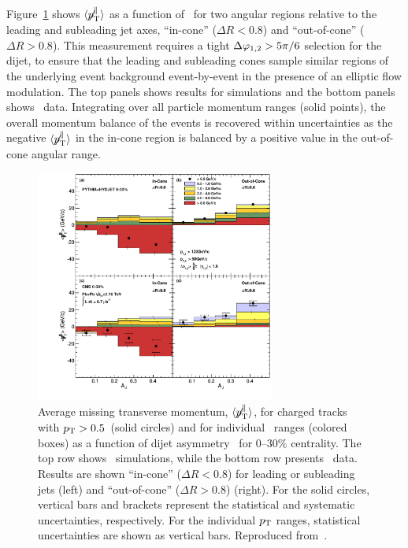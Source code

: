 Figure~\ref{fig:GR:CMS_missingpT} shows $\langle \displaystyle{\not} p_{\mathrm{T}}^{\parallel} \rangle$
as a function of \AJ\ for two angular regions relative to the leading and subleading
jet axes, ``in-cone'' ($\Delta R < 0.8$) and ``out-of-cone'' ($\Delta R > 0.8$).
This measurement requires a tight $\Delta\varphi_{1,2} > 5 \pi/6$ selection for the dijet, to ensure that the 
leading and subleading cones sample similar regions of the underlying event background 
event-by-event in the presence of an elliptic flow modulation.
The top panels shows results for  {} simulations and the bottom panels shows
\PbPb\ data. Integrating over all particle momentum ranges (solid points),
 the overall momentum balance of the events is recovered within uncertainties
as the negative $\langle \displaystyle{\not} p_{\mathrm{T}}^{\parallel} \rangle$ in
the in-cone region is balanced by a positive value in the out-of-cone angular range.

\begin{figure}[!ht]
\begin{center}
\includegraphics[width=0.7\textwidth]{jetfigures/missingPtParallel-Corrected-data-InConeOutConeDPhiCut_ntv6_2.pdf}
\caption{Average missing transverse momentum,
$\langle \displaystyle{\not} p_{\mathrm{T}}^{\parallel} \rangle$,
for charged tracks with $\mbox{$p_{\mathrm{T}}$} > 0.5$\GeVc\ (solid circles) and for individual \pT\ ranges (colored boxes)
as a function of dijet asymmetry \AJ\ for 0--30\% centrality.
The top row shows \PYTHYD\ simulations, while the bottom row presents \PbPb\ data.
Results are shown ``in-cone'' ($\Delta R < 0.8$) for leading or subleading jets (left) and
``out-of-cone'' ($\Delta R > 0.8$) (right).
For the solid circles, vertical bars and brackets represent
the statistical and systematic uncertainties, respectively.
For the individual $\mbox{$p_{\mathrm{T}}$}$ ranges, statistical uncertainties are shown as vertical bars.
Reproduced from~\cite{Chatrchyan:2011sx}.}
\label{fig:GR:CMS_missingpT}
\end{center}
\end{figure}

